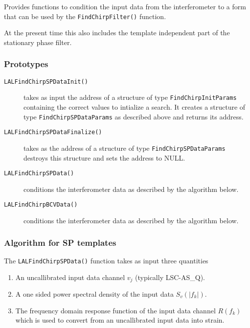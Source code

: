Provides functions to condition the input data from the interferometer
to a form that can be used by the \texttt{FindChirpFilter()} function.

At the present time this also includes the template independent part of the
stationary phase filter.

\subsubsection*{Prototypes}
\vspace{0.1in}


\begin{description}
\item[\texttt{LALFindChirpSPDataInit()}] takes as input the address
of a structure of type \texttt{FindChirpInitParams} containing the correct
values to intialize a search. It creates a structure of type
\texttt{FindChirpSPDataParams} as described above and returns its address.

\item[\texttt{LALFindChirpSPDataFinalize()}] takes as the address
of a structure of type \texttt{FindChirpSPDataParams} destroys this 
structure and sets the address to NULL.

\item[\texttt{LALFindChirpSPData()}] conditions the interferometer data
as described by the algorithm below.

\item[\texttt{LALFindChirpBCVData()}] conditions the interferometer data
as described by the algorithm below.
\end{description}

\subsubsection*{Algorithm for SP templates}

The \texttt{LALFindChirpSPData()} function takes as input three quantities
\begin{enumerate}
\item An uncallibrated input data channel $v_j$ (typically LSC-AS\_Q).
\item A one sided power spectral density of the input data $S_v(|f_k|)$.
\item The frequency domain response function of the input data channel
$R(f_k)$ which is used to convert from an uncallibrated input data into
strain.
\end{enumerate}

